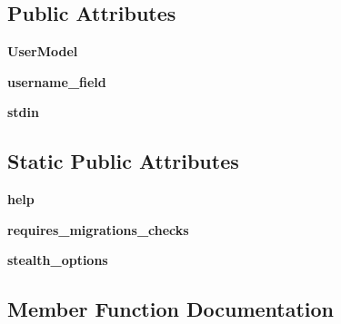 \subsection*{Public Attributes}
\begin{DoxyCompactItemize}
\item 
\mbox{\label{classcreatesuperuser_1_1_command_a3b8897b64b8a1a64f364e13a04d757cb}} 
{\bfseries User\+Model}
\item 
\mbox{\label{classcreatesuperuser_1_1_command_a9cb7ddb488f8a0c46e9fc9b94c8c9de1}} 
{\bfseries username\+\_\+field}
\item 
\mbox{\label{classcreatesuperuser_1_1_command_a807ebd087f981096a4510b81347138bb}} 
{\bfseries stdin}
\end{DoxyCompactItemize}
\subsection*{Static Public Attributes}
\begin{DoxyCompactItemize}
\item 
\mbox{\label{classcreatesuperuser_1_1_command_af771ed27b64b1a031277d6ac5b6afbd0}} 
{\bfseries help}
\item 
\mbox{\label{classcreatesuperuser_1_1_command_a9d1b4486e46f3efe42dc0a519bd9d31b}} 
{\bfseries requires\+\_\+migrations\+\_\+checks}
\item 
\mbox{\label{classcreatesuperuser_1_1_command_a2213a0f914d32eefccc811ca45a8b588}} 
{\bfseries stealth\+\_\+options}
\end{DoxyCompactItemize}


\subsection{Member Function Documentation}
\mbox{\label{classcreatesuperuser_1_1_command_a266caf1cffd3b4105c0e7ae710a12016}} 
